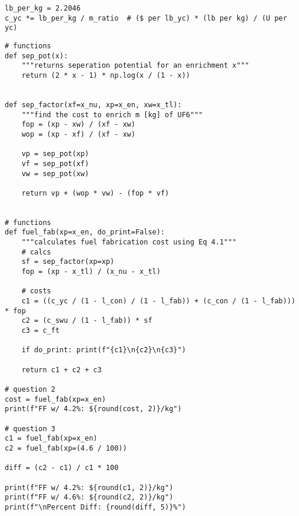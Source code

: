 \documentclass[11pt,answers,addpoints]{exam}
\begin{document}
\begin{questions}
\begin{solution}
\begin{verbatim}
lb_per_kg = 2.2046
c_yc *= lb_per_kg / m_ratio  # ($ per lb_yc) * (lb per kg) / (U per yc)
\end{verbatim}

\begin{verbatim}
# functions
def sep_pot(x):
    """returns seperation potential for an enrichment x"""
    return (2 * x - 1) * np.log(x / (1 - x))


def sep_factor(xf=x_nu, xp=x_en, xw=x_tl):
    """find the cost to enrich m [kg] of UF6"""
    fop = (xp - xw) / (xf - xw)
    wop = (xp - xf) / (xf - xw)

    vp = sep_pot(xp)
    vf = sep_pot(xf)
    vw = sep_pot(xw)

    return vp + (wop * vw) - (fop * vf)


# functions
def fuel_fab(xp=x_en, do_print=False):
    """calculates fuel fabrication cost using Eq 4.1"""
    # calcs
    sf = sep_factor(xp=xp)
    fop = (xp - x_tl) / (x_nu - x_tl)

    # costs
    c1 = ((c_yc / (1 - l_con) / (1 - l_fab)) + (c_con / (1 - l_fab))) * fop
    c2 = (c_swu / (1 - l_fab)) * sf
    c3 = c_ft

    if do_print: print(f"{c1}\n{c2}\n{c3}")

    return c1 + c2 + c3

# question 2
cost = fuel_fab(xp=x_en)
print(f"FF w/ 4.2%: ${round(cost, 2)}/kg")

# question 3
c1 = fuel_fab(xp=x_en)
c2 = fuel_fab(xp=(4.6 / 100))

diff = (c2 - c1) / c1 * 100

print(f"FF w/ 4.2%: ${round(c1, 2)}/kg")
print(f"FF w/ 4.6%: ${round(c2, 2)}/kg")
print(f"\nPercent Diff: {round(diff, 5)}%")
\end{verbatim}
        \end{solution}
\end{questions}
\end{document}
